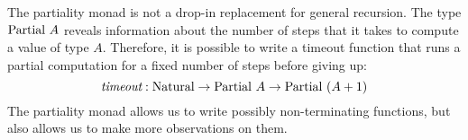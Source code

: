 The partiality monad is not a drop-in replacement for general
recursion. The type $\textrm{Partial}~A$ reveals information about the
number of steps that it takes to compute a value of type
$A$. Therefore, it is possible to write a timeout function that runs a
partial computation for a fixed number of steps before giving up:
\begin{displaymath}
  \textit{timeout} : \textrm{Natural} \to \textrm{Partial}~A \to \textrm{Partial}~(A + 1)
\end{displaymath}
The partiality monad allows us to write possibly non-terminating
functions, but also allows us to make more observations on them.

